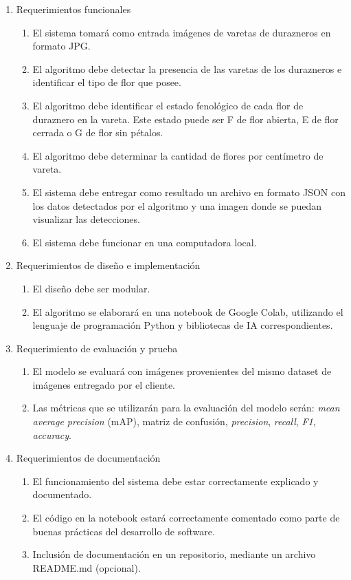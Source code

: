 \documentclass[
11pt, %
]{charter}
\begin{document}
\begin{enumerate}
	\item Requerimientos funcionales
		\begin{enumerate}
			\item El sistema tomará como entrada imágenes de varetas de durazneros en formato JPG.			
			\item El algoritmo debe detectar la presencia de las varetas de los durazneros e identificar el tipo de flor que posee.			        
			\item El algoritmo debe identificar el estado fenológico de cada flor de duraznero en la vareta. Este estado puede ser F de flor abierta, E de flor cerrada o G de flor sin pétalos. 
			\item El algoritmo debe determinar la cantidad de flores por centímetro de vareta.
			\item El sistema debe entregar como resultado un archivo en formato JSON con los datos detectados por el algoritmo y una imagen donde se puedan visualizar las detecciones.
			\item El sistema debe funcionar en una computadora local.
		\end{enumerate}
	\item Requerimientos de diseño e implementación
		\begin{enumerate}
			\item El diseño debe ser modular.
			\item El algoritmo se elaborará en una notebook de Google Colab, utilizando el lenguaje de  programación Python y bibliotecas de IA correspondientes. 
		\end{enumerate}
	\item Requerimiento de evaluación y prueba
	\begin{enumerate}
			\item El modelo se evaluará con imágenes provenientes del mismo dataset de imágenes entregado por el cliente.
			 \item Las métricas que se utilizarán para la evaluación del modelo serán: \textit{mean average precision} (mAP), matriz de confusión, \textit{precision}, \textit{recall}, \textit{F1}, \textit{accuracy}.
		\end{enumerate}
	\item Requerimientos de documentación
	\begin{enumerate}
			\item El funcionamiento del sistema debe estar correctamente explicado y documentado.
			 \item El código en la notebook estará correctamente comentado como parte de buenas prácticas del desarrollo de software.
			 \item Inclusión de documentación en un repositorio, mediante un archivo README.md (opcional).
		\end{enumerate}
\end{enumerate}
\end{document}
